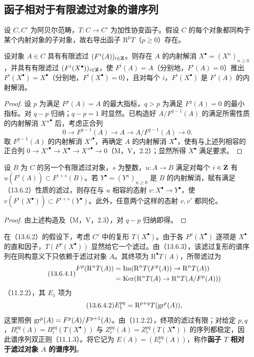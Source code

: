 \subsection{函子相对于有限滤过对象的谱序列}
设 $C,C'$ 为阿贝尔范畴，$T:C\to C'$ 为加性协变函子。假设 $C$ 的每个对象都同构于某个内射对象的子对象，故右导出函子 $\mathrm R^pT$（$p\geq0$）存在。

设对象 $A\in C$ 具有有限滤过 $(F^i(A))_{i\in\mathbf Z}$。则存在 $A$ 的内射解消 $X^\bullet=(X^n)_{n\geq0}$，并具有有限滤过 $(F^i(X^\bullet))_{i\in\mathbf Z}$，使 $F^i(A)=A$（分别地，$F^i(A)=0$）推出 $F^i(X^\bullet)=X^\bullet$（分别地，$F^i(X^\bullet)=0$），且对每个 $i$，$F^i(X^\bullet)$ 是 $F^i(A)$ 的内射解消。
\begin{proof}
设 $p$ 为满足 $F^p(A)=A$ 的最大指标，$q>p$ 为满足 $F^q(A)=0$ 的最小指标。对 $q-p$ 归纳；$q-p=1$ 时显然。已构造好 $A/F^{q-1}(A)$ 的满足所需性质的内射解消 $X''^\bullet$ 后，考虑正合列
\[
0\to F^{q-1}(A)\to A\to A/F^{q-1}(A)\to0.
\]
取 $F^{q-1}(A)$ 的内射解消 $X'^\bullet$，再确定 $A$ 的内射解消 $X^\bullet$，使有与上述列相容的正合列 $0\to X'^\bullet\to X^\bullet\to X''^\bullet\to0$（M，V，2.2）；显然所得 $X^\bullet$ 满足要求。
\end{proof}

设 $B$ 为 $C$ 的另一个有限滤过对象，$s$ 为整数，$u:A\to B$ 满足对每个 $i\in\mathbf Z$ 有 $u(F^i(A))\subset F^{i+s}(B)$。若 $Y^\bullet=(Y^n)_{n\geq0}$ 是 $B$ 的内射解消，赋有满足（13.6.2）性质的滤过，则存在与 $u$ 相容的态射 $v:X^\bullet\to Y^\bullet$，使 $v(F^i(X^\bullet))\subset F^{i+s}(Y^\bullet)$。此外，任意两个这样的态射 $v,v'$ 都同伦。
\begin{proof}
由上述构造及（M，V，2.3），对 $q-p$ 归纳即得。
\end{proof}

在（13.6.2）的假设下，考虑 $C'$ 中的复形 $T(X^\bullet)$。由于各 $F^p(X^\bullet)$ 逐项是 $X^\bullet$ 的直和因子，$T(F^p(X^\bullet))$ 显然给它一个滤过。由（13.6.3），该滤过复形的谱序列在同构意义下只依赖于滤过对象 $A$。其终项为 $\mathrm R^\bullet T(A)$，所带滤过为
\begin{equation}\tag{13.6.4.1}
\begin{aligned}
F^p(\mathrm R^nT(A))
&=\operatorname{Im}(\mathrm R^nT(F^p(A))\to\mathrm R^nT(A))\\
&=\operatorname{Ker}(\mathrm R^nT(A)\to\mathrm R^nT(A/F^p(A)))
\end{aligned}
\end{equation}
（11.2.2），其 $E_1$ 项为
\begin{equation}\tag{13.6.4.2}
E_1^{pq}=\mathrm R^{p+q}T(\operatorname{gr}^p(A)),
\end{equation}
这里照例 $\operatorname{gr}^p(A)=F^p(A)/F^{p+1}(A)$。由（11.2.2），终项的滤过有限；对给定 $p,q$，$B_r^{pq}(A)=B_r^{pq}(T(X^\bullet))$ 与 $Z_r^{pq}(A)=Z_r^{pq}(T(X^\bullet))$ 的序列都稳定，因此谱序列双正则（11.1.3）。将它记为 $E(A)=(E_r^{pq}(A))$，称作\textbf{函子 $T$ 相对于滤过对象 $A$ 的谱序列}。


